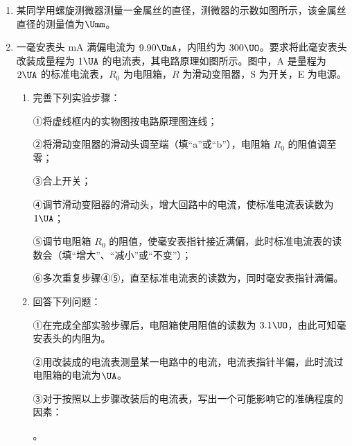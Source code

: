\documentclass[\gkver]{gaokaozhenti}
\begin{document}
\begin{enumerate}
\item
某同学用螺旋测微器测量一金属丝的直径，测微器的示数如图所示，该金属丝直径的测量值为$\Umm$。




\item
一毫安表头 mA 满偏电流为 $9.90\UmA$，内阻约为 $300\UO$。要求将此毫安表头改装成量程为 $1\UA$ 的电流表，其电路原理如图所示。图中，A 是量程为 $2\UA$ 的标准电流表，$R_{0}$ 为电阻箱，$R$ 为滑动变阻器，S 为开关，E 为电源。

\begin{enumerate}
	\item
	完善下列实验步骤：
	
	①将虚线框内的实物图按电路原理图连线；
	
	②将滑动变阻器的滑动头调至端（填“a”或“b”），电阻箱 $R_{0}$ 的阻值调至零；
	
	③合上开关；
	
	④调节滑动变阻器的滑动头，增大回路中的电流，使标准电流表读数为 $1\UA$；
	
	⑤调节电阻箱 $R_{0}$ 的阻值，使毫安表指针接近满偏，此时标准电流表的读数会（填“增大”、“减小”或“不变”）；
	
	⑥多次重复步骤④⑤，直至标准电流表的读数为\tkanswer[1.2cm]{$1\UA$}，同时毫安表指针满偏。
	
	\item
	回答下列问题：
	
	①在完成全部实验步骤后，电阻箱使用阻值的读数为 $3.1\UO$，由此可知毫安表头的内阻为\tkanswer[1.5cm]{$310\UO$}。
	
	②用改装成的电流表测量某一电路中的电流，电流表指针半偏，此时流过电阻箱的电流为$\UA$。
	
	③对于按照以上步骤改装后的电流表，写出一个可能影响它的准确程度的因素：

	\tkanswer[8cm]{}。
\end{enumerate}


\end{enumerate}
\end{document}
